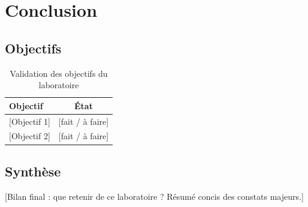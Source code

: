 \chapter{Conclusion}
\label{chap:conclusion}

\section{Objectifs}

\begin{table}[H]
  \centering
  \small
  \begin{tabular}{p{9.5cm}c}
    \toprule
    Objectif & État \\
    \midrule
    {[Objectif 1]} & [fait / à faire] \\
    {[Objectif 2]} & [fait / à faire] \\
    \bottomrule
  \end{tabular}
  \caption{Validation des objectifs du laboratoire}
  \label{tab:objectifs}
\end{table}

\section{Synthèse}

[Bilan final : que retenir de ce laboratoire ? Résumé concis des constats majeurs.]

